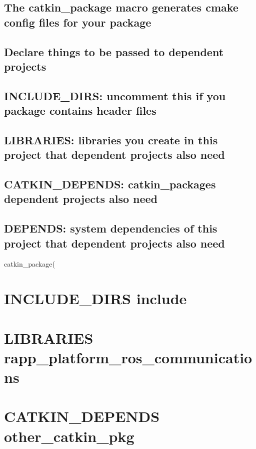 \subparagraph*{}

\subsection*{The catkin\-\_\-package macro generates cmake config files for your package}

\subsection*{Declare things to be passed to dependent projects}

\subsection*{I\-N\-C\-L\-U\-D\-E\-\_\-\-D\-I\-R\-S\-: uncomment this if you package contains header files}

\subsection*{L\-I\-B\-R\-A\-R\-I\-E\-S\-: libraries you create in this project that dependent projects also need}

\subsection*{C\-A\-T\-K\-I\-N\-\_\-\-D\-E\-P\-E\-N\-D\-S\-: catkin\-\_\-packages dependent projects also need}

\subsection*{D\-E\-P\-E\-N\-D\-S\-: system dependencies of this project that dependent projects also need}

catkin\-\_\-package( \section*{I\-N\-C\-L\-U\-D\-E\-\_\-\-D\-I\-R\-S include}

\section*{L\-I\-B\-R\-A\-R\-I\-E\-S rapp\-\_\-platform\-\_\-ros\-\_\-communications}

\section*{C\-A\-T\-K\-I\-N\-\_\-\-D\-E\-P\-E\-N\-D\-S other\-\_\-catkin\-\_\-pkg}

